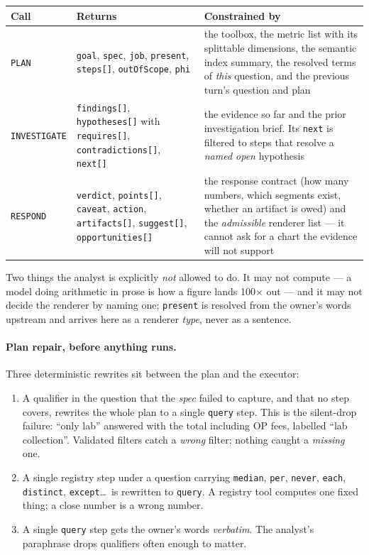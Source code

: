 \documentclass[11pt,a4paper]{report}
\newcommand{\code}[1]{\texttt{\small #1}}
\begin{document}
\begin{center}
\small
\begin{tabular}{@{}p{2.2cm}p{5.6cm}p{6.8cm}@{}}
\toprule
\textbf{Call} & \textbf{Returns} & \textbf{Constrained by}\\
\midrule
\code{PLAN} & \code{goal}, \code{spec}, \code{job}, \code{present}, \code{steps[]},
 \code{outOfScope}, \code{phi} & the toolbox, the metric list with its splittable dimensions, the
 semantic index summary, the resolved terms of \emph{this} question, and the previous turn's
 question and plan\\
\code{INVESTIGATE} & \code{findings[]}, \code{hypotheses[]} with \code{requires[]},
 \code{contradictions[]}, \code{next[]} & the evidence so far and the prior investigation brief.
 Its \code{next} is filtered to steps that resolve a \emph{named open} hypothesis\\
\code{RESPOND} & \code{verdict}, \code{points[]}, \code{caveat}, \code{action},
 \code{artifacts[]}, \code{suggest[]}, \code{opportunities[]} & the response contract (how many
 numbers, which segments exist, whether an artifact is owed) and the \emph{admissible} renderer
 list --- it cannot ask for a chart the evidence will not support\\
\bottomrule
\end{tabular}
\end{center}

\noindent Two things the analyst is explicitly \emph{not} allowed to do. It may not compute --- a
model doing arithmetic in prose is how a figure lands 100$\times$ out --- and it may not decide the
renderer by naming one; \code{present} is resolved from the owner's words upstream and arrives here
as a renderer \emph{type}, never as a sentence.

\paragraph{Plan repair, before anything runs.} Three deterministic rewrites sit between the plan
and the executor:

\begin{enumerate}[leftmargin=*,itemsep=1pt]
\item A qualifier in the question that the \emph{spec} failed to capture, and that no step covers,
      rewrites the whole plan to a single \code{query} step. This is the silent-drop failure:
      ``only lab'' answered with the total including OP fees, labelled ``lab collection''.
      Validated filters catch a \emph{wrong} filter; nothing caught a \emph{missing} one.
\item A single registry step under a question carrying \code{median}, \code{per}, \code{never},
      \code{each}, \code{distinct}, \code{except}\ldots\ is rewritten to \code{query}. A registry
      tool computes one fixed thing; a close number is a wrong number.
\item A single \code{query} step gets the owner's words \emph{verbatim}. The analyst's paraphrase
      drops qualifiers often enough to matter.
\end{enumerate}
\end{document}

